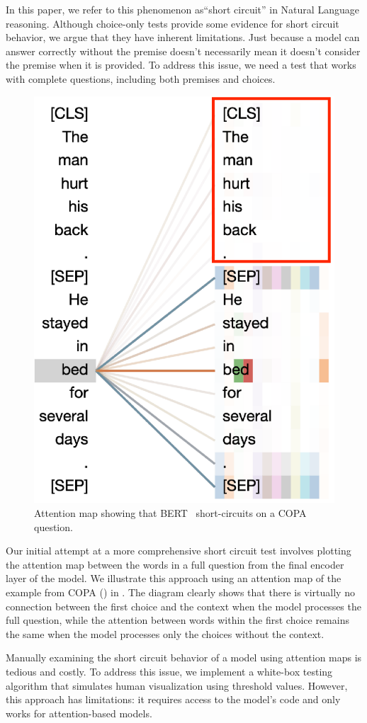 In this paper, we refer to this phenomenon as``short circuit'' in Natural Language reasoning. Although choice-only tests provide some evidence for short circuit behavior, we argue that they have inherent limitations. Just because a model can answer correctly without the premise doesn't necessarily mean it doesn't consider the premise when it is provided. To address this issue, we need a test that works with complete questions, including both premises and choices.
\begin{figure}[th!]
\centering
\includegraphics[width=0.6\columnwidth]{figure/end_related.eps}
\caption{Attention map showing that BERT~\cite{devlin2018bert} 
short-circuits on a COPA question.}
\label{fig:att-goodex}
\end{figure}



Our initial attempt at a more comprehensive short circuit test involves plotting the attention map between the words in a full question from the final encoder layer of the model. We illustrate this approach using an attention map of the example from COPA () in . The diagram clearly shows that there is virtually no connection between the first choice and the context when the model processes the full question, while the attention between words within the first choice remains the same when the model processes only the choices without the context.

Manually examining the short circuit behavior of a model using attention maps is tedious and costly. To address this issue, we implement a white-box testing algorithm that simulates human visualization using threshold values. However, this approach has limitations: it requires access to the model's code and only works for attention-based models.

